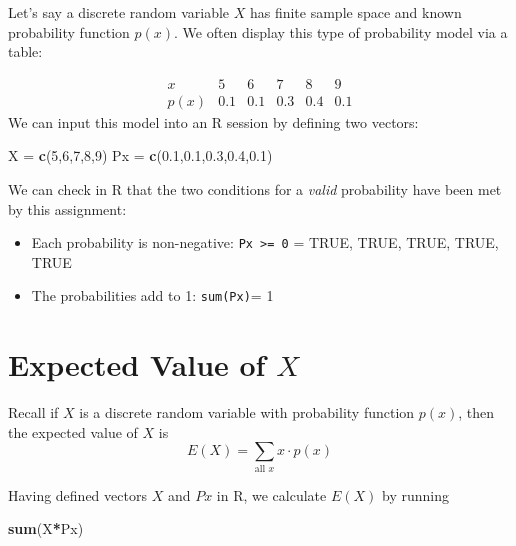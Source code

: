 \documentclass[
]{book}
\newenvironment{Shaded}{\begin{snugshade}}{\end{snugshade}}
\newcommand{\DecValTok}[1]{\textcolor[rgb]{0.00,0.00,0.81}{#1}}
\newcommand{\FloatTok}[1]{\textcolor[rgb]{0.00,0.00,0.81}{#1}}
\newcommand{\FunctionTok}[1]{\textcolor[rgb]{0.13,0.29,0.53}{\textbf{#1}}}
\newcommand{\NormalTok}[1]{#1}
\newcommand{\OtherTok}[1]{\textcolor[rgb]{0.56,0.35,0.01}{#1}}
\newcommand{\SpecialCharTok}[1]{\textcolor[rgb]{0.81,0.36,0.00}{\textbf{#1}}}
\providecommand{\tightlist}{%
  \setlength{\itemsep}{0pt}\setlength{\parskip}{0pt}}
\theoremstyle{definition}
\theoremstyle{definition}
\theoremstyle{definition}
\theoremstyle{definition}
\theoremstyle{remark}
\begin{document}
Let's say a discrete random variable \(X\) has finite sample space and known probability function \(p(x)\). We often display this type of probability model via a table:

\[
\begin{array}{c|c|c|c|c|c}
x & 5 & 6 & 7 & 8 & 9 \\ \hline
p(x) & 0.1 & 0.1 & 0.3 & 0.4 & 0.1 
\end{array}
\]
We can input this model into an R session by defining two vectors:

\begin{Shaded}
\begin{Highlighting}[]
\NormalTok{X }\OtherTok{=} \FunctionTok{c}\NormalTok{(}\DecValTok{5}\NormalTok{,}\DecValTok{6}\NormalTok{,}\DecValTok{7}\NormalTok{,}\DecValTok{8}\NormalTok{,}\DecValTok{9}\NormalTok{)}
\NormalTok{Px }\OtherTok{=} \FunctionTok{c}\NormalTok{(}\FloatTok{0.1}\NormalTok{,}\FloatTok{0.1}\NormalTok{,}\FloatTok{0.3}\NormalTok{,}\FloatTok{0.4}\NormalTok{,}\FloatTok{0.1}\NormalTok{)}
\end{Highlighting}
\end{Shaded}

We can check in R that the two conditions for a \emph{valid} probability have been met by this assignment:

\begin{itemize}
\tightlist
\item
  Each probability is non-negative: \texttt{Px\ \textgreater{}=\ 0} = TRUE, TRUE, TRUE, TRUE, TRUE
\item
  The probabilities add to 1: \texttt{sum(Px)}= 1
\end{itemize}

\section{\texorpdfstring{Expected Value of \(X\)}{Expected Value of X}}\label{expected-value-of-x}

Recall if \(X\) is a discrete random variable with probability function \(p(x)\), then the expected value of \(X\) is \[E(X)=\sum_{\text{all }x}x\cdot p(x)\]

Having defined vectors \(X\) and \(Px\) in R, we calculate \(E(X)\) by running

\begin{Shaded}
\begin{Highlighting}[]
\FunctionTok{sum}\NormalTok{(X}\SpecialCharTok{*}\NormalTok{Px) }
\end{Highlighting}
\end{Shaded}
\end{document}
